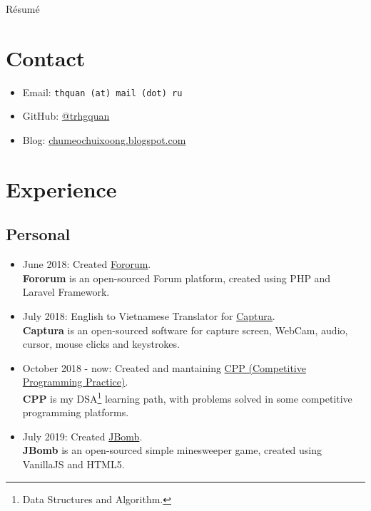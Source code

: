 \documentclass{article}
\renewcommand{\maketitle}{
\begin{center}
{\huge\bfseries\theauthor}
\linebreak\linebreak
R\'esum\'e
\end{center}
}
\begin{document}
\author{Quan, Tran Hoang}
\maketitle

\section{Contact}
\begin{itemize}
\item Email: \texttt{thquan (at) mail (dot) ru}
\item GitHub: \href{https://github.com/trhgquan}{@trhgquan}
\item Blog: \href{https://chumeochuixoong.blogspot.com}{chumeochuixoong.blogspot.com}
\end{itemize}

\section{Experience}
\subsection{Personal}
\begin{itemize}
\item June 2018: Created \href{https://github.com/trhgquan/Fororum}{Fororum}.\\
\textbf{Fororum} is an open-sourced Forum platform, created using PHP and Laravel Framework.

\item July 2018: English to Vietnamese Translator for \href{https://github.com/MathewSachin/Captura}{Captura}.\\
\textbf{Captura} is an open-sourced software for capture screen, WebCam, audio, cursor, mouse clicks and keystrokes.

\item October 2018 - now: Created and mantaining \href{https://github.com/trhgquan/CPP}{CPP (Competitive Programming Practice)}.\\
\textbf{CPP} is my DSA\footnote{Data Structures and Algorithm.} learning path, with problems solved in some competitive programming platforms.

\item July 2019: Created \href{https://github.com/trhgquan/JBomb}{JBomb}.\\
\textbf{JBomb} is an open-sourced simple minesweeper game, created using VanillaJS and HTML5.
\end{itemize}
\end{document}
